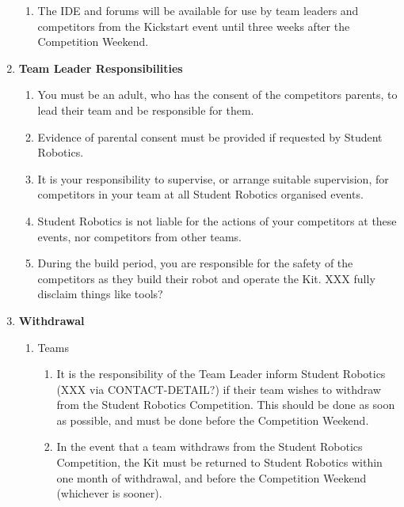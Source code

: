 \documentclass[a4paper, 11pt]{scrartcl}
\begin{document}
\begin{enumerate}
\begin{enumerate}
\item The IDE and forums will be available for use by team leaders and competitors
from the Kickstart event until three weeks after the Competition Weekend.

\end{enumerate}

\item \textbf{Team Leader Responsibilities}
\begin{enumerate}

\item You must be an adult, who has the consent of the competitors parents, to
lead their team and be responsible for them.

\item Evidence of parental consent must be provided if requested by Student
Robotics.

\item It is your responsibility to supervise, or arrange suitable supervision,
for competitors in your team at all Student Robotics organised events.

\item Student Robotics is not liable for the actions of your competitors at
these events, nor competitors from other teams.

\item During the build period, you are responsible for the safety of the
competitors as they build their robot and operate the Kit. XXX fully disclaim
things like tools?

\end{enumerate}

\item \textbf{Withdrawal}
\begin{enumerate}

\item Teams
\begin{enumerate}
\item It is the responsibility of the Team Leader inform
Student Robotics (XXX via CONTACT-DETAIL?) if their team wishes to withdraw
from the Student Robotics Competition. This should be done as soon as possible,
and must be done before the Competition Weekend.

\item In the event that a team withdraws from the Student Robotics Competition,
the Kit must be returned to Student Robotics within one month of withdrawal,
and before the Competition Weekend (whichever is sooner).
\end{enumerate}


\end{enumerate}
\end{enumerate}
\end{document}
